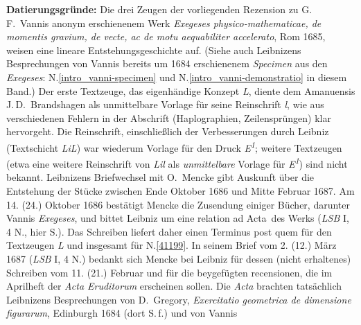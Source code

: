 \vspace{5mm}
\begin{ledgroup}
\footnotesize
\pstart
\noindent%
\textbf{Datierungsgründe:}
Die drei Zeugen der vorliegenden Rezension zu 
G.\,F.~Vannis anonym erschienenem Werk
\cite{02000}\textit{Exegeses physico-mathematicae, de momentis gravium, de vecte, ac de motu aequabiliter accelerato}, Rom 1685,
weisen eine lineare Entstehungsgeschichte auf.
(Siehe auch Leibnizens Besprechungen von Vannis bereits um 1684 erschienenem \cite{01995}\textit{Specimen} aus den \textit{Exegeses}: N.\;\ref{intro_vanni-specimen} und N.\;\ref{intro_vanni-demonstratio} in diesem Band.)
Der erste Textzeuge, das eigenhändige Konzept \textit{L}, 
diente dem Amanuensis
J.\,D.~Brandshagen als unmittelbare Vorlage für seine Reinschrift \textit{l}, wie aus verschiedenen Fehlern in der Abschrift (Haplographien, Zeilensprüngen) klar hervorgeht.
Die Reinschrift, einschließlich der Verbesserungen durch Leibniz (Textschicht \textit{LiL}) war wiederum Vorlage für den Druck \textit{E\textsuperscript{1}}; weitere Textzeugen (etwa eine weitere Reinschrift von \textit{Lil} als \textit{unmittelbare} Vorlage für \textit{E\textsuperscript{1}}) sind nicht bekannt.
\pend
\pstart
Leibnizens Briefwechsel mit O.~Mencke %
gibt Auskunft über die Entstehung der Stücke zwischen Ende Oktober 1686 und Mitte Februar 1687.
Am \cite{02013}14. (24.) Oktober 1686 bestätigt Mencke die Zusendung einiger Bücher, 
darunter Vannis \cite{02000}\textit{Exegeses}, und bittet Leibniz um eine \glqq relation ad Acta\grqq\ des Werks (\textit{LSB} I, 4 N., hier S.). 
Das Schreiben liefert daher einen Terminus post quem für den Textzeugen \textit{L} und insgesamt für N.\;\ref{41199}.
In seinem \cite{02014}Brief vom 2. (12.) März 1687 (\cite{00115}\textit{LSB} I, 4 N.)
bedankt sich Mencke
bei Leibniz für dessen (nicht erhaltenes) Schreiben vom 11. (21.) Februar und für die \glqq beygefügten recensionen\grqq, die im Aprilheft der \cite{01023}\textit{Acta Eruditorum} erscheinen sollen. 
Die \textit{Acta} brachten tatsächlich Leibnizens Besprechungen von
%
D.~Gregory, \textit{Exercitatio geometrica de dimensione figurarum}, Edinburgh 1684 (dort S.\,f.)
und von Vannis 

\end{ledgroup}
